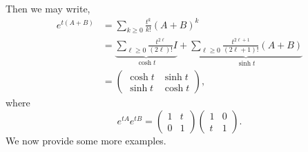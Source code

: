 Then we may write,
\begin{align*}
    e^{t(A + B)} &= \sum_{k \geq 0} \frac{t^k}{k!} (A+B)^k \\
    &= \underbrace{\sum_{\ell \geq 0} \frac{t^{2\ell}}{(2\ell)!} I}_{\cosh t} + \underbrace{\sum_{\ell \geq 0} \frac{t^{2\ell + 1}}{(2\ell + 1)!} (A + B)}_{\sinh t} \\
    &= \begin{pmatrix} \cosh t & \sinh t \\ \sinh t & \cosh t \end{pmatrix},
\end{align*}
where
\[ e^{tA} e^{tB} = \begin{pmatrix} 1 & t \\ 0 & 1 \end{pmatrix} \begin{pmatrix} 1 & 0 \\ t & 1 \end{pmatrix}. \]
We now provide some more examples.

